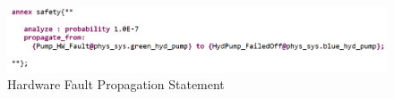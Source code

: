 \begin{figure}[h!]
	\vspace{-0.2in}
	\begin{center}
		\includegraphics[width=1.0\textwidth]{images/hw_prop_stmt.png}
	\end{center}
	\vspace{-0.3in}
	\caption{Hardware Fault Propagation Statement}
	\label{fig:hwFaultProp}
	\vspace{-0.2in}
\end{figure}

